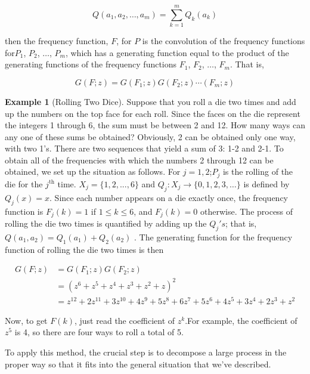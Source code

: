 \documentclass[10pt,]{book}
\theoremstyle{plain}
\theoremstyle{definition}
\theoremstyle{definition}
\theoremstyle{definition}
\newtheorem{example}[theorem]{Example}
\theoremstyle{definition}
\numberwithin{equation}{section}
\begin{document}
 \[Q\left(a_1,a_2, \ldots , a_m\right)= \sum_{k=1}^m Q_k\left(a_k\right)\]



then the frequency function, \(F\), for \(P\) is the convolution of the frequency functions for\(P_1\), \(P_2\), \(\ldots\), \(P_m\),
which has a generating function equal to the product of the generating functions of the frequency functions \(F_1\), \(F_2\), \(\ldots\), \(F_m\).  That is,

\begin{equation*}
G(F;z) =G\left(F_1;z\right)G\left(F_2;z\right) \cdots \left(F_m;z\right)
\end{equation*}

%
\begin{example}[Rolling Two Dice]\label{ex-dice-roll}
 Suppose that you roll a die two times and add up the numbers on the top face for each roll. Since the faces on the die represent
the integers 1 through 6, the sum must be between 2 and 12. How many ways can any one of these sums be obtained? Obviously, 2 can be obtained only
one way, with two 1's. There are two sequences that yield a sum of 3: 1-2 and 2-1. To obtain all of the frequencies with which the numbers 2 through
12 can be obtained, we set up the situation as follows. For \(j = 1, 2\);\(P_j\) is the rolling of the die for the \(j^{\text{th}}\) time. \(X_j
= \{1, 2, . . . , 6\}\) and \(Q_j : X_j \rightarrow \{0, 1, 2, 3,\ldots \}\) is defined by \(Q_j(x) = x\). Since each number appears on a die exactly once,
the frequency function is \(F_j(k)=1\) if \(1 \leq  k \leq  6\), and \(F_j(k) = 0\) otherwise. The process of rolling the die two times is quantified
by adding up the \(Q_j's\); that is, \(Q\left(a_1, a_2\right) =Q_{1}\left(a_1\right)+Q_2\left(a_2\right)\) . The generating function for the
frequency function of rolling the die two times is then

\begin{equation*}
\begin{split}
G(F; z) & = G\left(F_1;z\right)G\left(F_2;z\right)\\
		&  = (z^6+z^5+z^4+z^3+z^2+z)^2\\
		& =z^{12}+2 z^{11}+3 z^{10}+4 z^9+5 z^8+6 z^7+5 z^6+4 z^5+3 z^4+2
z^3+z^2
\end{split}
\end{equation*}
%
\par
Now, to get \(F(k)\), just read the coefficient of \(z^k\).For example, the coefficient of \(z^5\) is 4, so there are four ways to roll a total
of 5.%
\par
To apply this method, the crucial step is to decompose a large process in the proper way so that it fits into the general situation that we've described.
%
\end{example}
\end{document}
